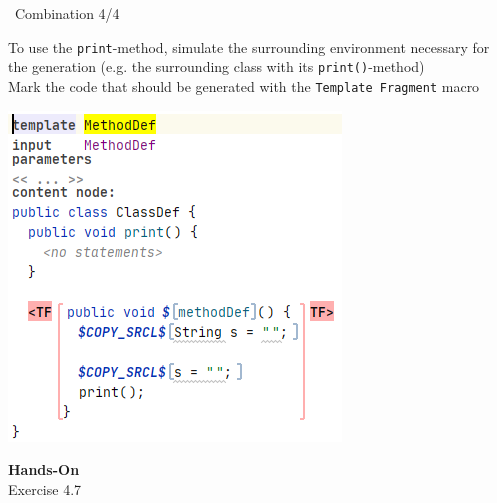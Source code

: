 	\begin{frame}{\workshoptemplate\ Combination 4/4}
	\begin{minipage}{0.52\textwidth}
		To use the \texttt{print}-method, simulate the surrounding environment necessary for the generation (e.g. the surrounding class with its \texttt{print()}-method)\\
		
		Mark the code that should be generated with the \texttt{Template Fragment} macro
	\end{minipage}
	\begin{minipage}{0.4\textwidth}
		\includegraphics[height=0.8\textheight]{illustrations/methodDefGen2.png}
	\end{minipage}
	\end{frame}

	\begin{frame}
		\begin{center}
			\Huge \textbf{Hands-On}\\
			
			Exercise 4.7
		\end{center}
	\end{frame}

